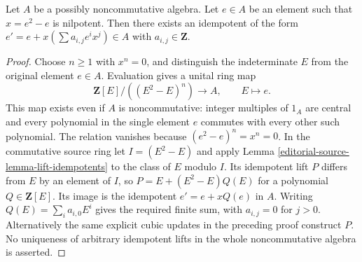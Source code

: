 \begin{lemma}
\label{editorial-source-lemma-lift-idempotents-noncommutative}
Let $A$ be a possibly noncommutative algebra.
Let $e \in A$ be an element such that $x = e^2 - e$ is nilpotent.
Then there exists an idempotent of the form
$e' = e + x(\sum a_{i, j}e^ix^j) \in A$
with $a_{i, j} \in \mathbf{Z}$.
\end{lemma}

\begin{proof}
Choose $n\geq1$ with $x^n=0$, and distinguish the indeterminate
$E$ from the original element $e\in A$. Evaluation gives a unital
ring map
$$
\mathbf Z[E]/((E^2-E)^n)\longrightarrow A,\qquad E\longmapsto e.
$$
This map exists even if $A$ is noncommutative: integer multiples of
$1_A$ are central and every polynomial in the single element $e$
commutes with every other such polynomial. The relation vanishes
because $(e^2-e)^n=x^n=0$.
In the commutative source ring let $I=(E^2-E)$ and apply
Lemma \ref{editorial-source-lemma-lift-idempotents} to the class of $E$ modulo $I$.
Its idempotent lift $P$ differs from $E$ by an element of $I$,
so $P=E+(E^2-E)Q(E)$ for a polynomial $Q\in\mathbf Z[E]$.
Its image is the idempotent $e'=e+xQ(e)$ in $A$.
Writing $Q(E)=\sum_i a_{i,0}E^i$ gives the required finite sum,
with $a_{i,j}=0$ for $j>0$. Alternatively the same explicit cubic
updates in the preceding proof construct $P$. No uniqueness of
arbitrary idempotent lifts in the whole noncommutative algebra is asserted.
\end{proof}